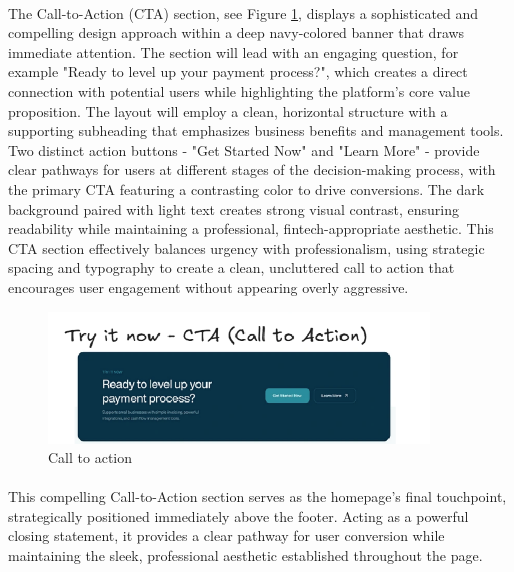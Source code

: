 \paragraph{} The Call-to-Action (CTA) section, see Figure \ref{fig:cta}, displays a sophisticated and compelling design approach within a deep navy-colored banner that draws immediate attention. The section will lead with an engaging question, for example "Ready to level up your payment process?", which creates a direct connection with potential users while highlighting the platform's core value proposition. The layout will employ a clean, horizontal structure with a supporting subheading that emphasizes business benefits and management tools. Two distinct action buttons - "Get Started Now" and "Learn More" - provide clear pathways for users at different stages of the decision-making process, with the primary CTA featuring a contrasting color to drive conversions. The dark background paired with light text creates strong visual contrast, ensuring readability while maintaining a professional, fintech-appropriate aesthetic. This CTA section effectively balances urgency with professionalism, using strategic spacing and typography to create a clean, uncluttered call to action that encourages user engagement without appearing overly aggressive.
\begin{figure}[h]
    \centering
    \includegraphics[width= 0.9\textwidth]{root/cta.png}
     \caption{Call to action}
    \label{fig:cta}
\end{figure}
\paragraph{}This compelling Call-to-Action section serves as the homepage's final touchpoint, strategically positioned immediately above the footer. Acting as a powerful closing statement, it provides a clear pathway for user conversion while maintaining the sleek, professional aesthetic established throughout the page.

